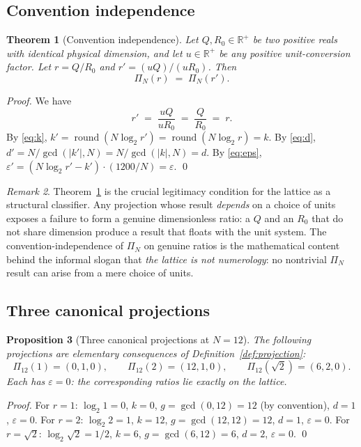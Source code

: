 \documentclass[11pt,a4paper]{article}
\newtheorem{theorem}{Theorem}[section]
\newtheorem{proposition}[theorem]{Proposition}
\theoremstyle{definition}
\theoremstyle{remark}
\newtheorem{remark}[theorem]{Remark}
\newcommand{\R}{\mathbb{R}}
\DeclareMathOperator{\round}{round}
\newcommand{\eps}{\varepsilon}
\begin{document}
\subsection{Convention independence}

\begin{theorem}[Convention independence]\label{thm:conv}
Let $Q,R_{0}\in\R^{+}$ be two positive reals with identical physical dimension, and let $u\in\R^{+}$ be any positive unit-conversion factor. Let $r = Q/R_{0}$ and $r' = (uQ)/(uR_{0})$. Then
\[
\Pi_{N}(r) \;=\; \Pi_{N}(r').
\]
\end{theorem}

\begin{proof}
We have
\[
r' \;=\; \frac{uQ}{uR_{0}} \;=\; \frac{Q}{R_{0}} \;=\; r.
\]
By \eqref{eq:k}, $k' = \round(N\log_{2}r') = \round(N\log_{2}r) = k$. By \eqref{eq:d}, $d'=N/\gcd(|k'|,N) = N/\gcd(|k|,N) = d$. By \eqref{eq:eps}, $\eps' = (N\log_{2}r'-k')\cdot(1200/N) = \eps$. \qed
\end{proof}

\begin{remark}
Theorem~\ref{thm:conv} is the crucial legitimacy condition for the lattice as a structural classifier. Any projection whose result \emph{depends} on a choice of units exposes a failure to form a genuine dimensionless ratio: a $Q$ and an $R_{0}$ that do not share dimension produce a result that floats with the unit system. The convention-independence of $\Pi_{N}$ on genuine ratios is the mathematical content behind the informal slogan that \emph{the lattice is not numerology}: no nontrivial $\Pi_{N}$ result can arise from a mere choice of units.
\end{remark}

\subsection{Three canonical projections}

\begin{proposition}[Three canonical projections at $N=12$]\label{prop:canonical}
The following projections are elementary consequences of Definition~\ref{def:projection}:
\[
\Pi_{12}(1) = (0,1,0), \qquad \Pi_{12}(2) = (12,1,0), \qquad \Pi_{12}(\sqrt{2}) = (6,2,0).
\]
Each has $\eps=0$: the corresponding ratios lie exactly on the lattice.
\end{proposition}

\begin{proof}
For $r=1$: $\log_{2}1 = 0$, $k=0$, $g=\gcd(0,12)=12$ (by convention), $d=1$, $\eps=0$. For $r=2$: $\log_{2}2 = 1$, $k=12$, $g=\gcd(12,12)=12$, $d=1$, $\eps=0$. For $r=\sqrt{2}$: $\log_{2}\sqrt{2}=1/2$, $k=6$, $g=\gcd(6,12)=6$, $d=2$, $\eps=0$. \qed
\end{proof}
\end{document}

